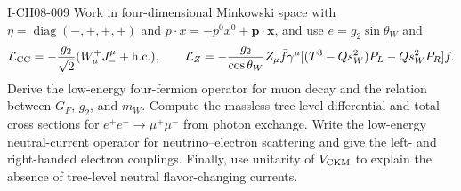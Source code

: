 \begin{exercise}{I-CH08-009}
Work in four-dimensional Minkowski space with
$\eta=\operatorname{diag}(-,+,+,+)$ and
$p\cdot x=-p^0x^0+\mathbf p\cdot\mathbf x$, and use
$e=g_2\sin\theta_W$ and
\[
 \mathcal L_{\rm CC}=-\frac{g_2}{\sqrt2}(W^+_\mu J_-^\mu+\mathrm{h.c.}),
 \qquad
 \mathcal L_Z=-\frac{g_2}{\cos\theta_W}Z_\mu
 \bar f\gamma^\mu[(T^3-Qs_W^2)P_L-Qs_W^2P_R]f.
\]
Derive the low-energy four-fermion operator for muon decay and the relation
between $G_F$, $g_2$, and $m_W$.  Compute the massless tree-level differential
and total cross sections for $e^+e^-\to\mu^+\mu^-$ from photon exchange.
Write the low-energy neutral-current operator for neutrino--electron
scattering and give the left- and right-handed electron couplings.  Finally,
use unitarity of $V_{\rm CKM}$ to explain the absence of tree-level neutral
flavor-changing currents.
\end{exercise}
